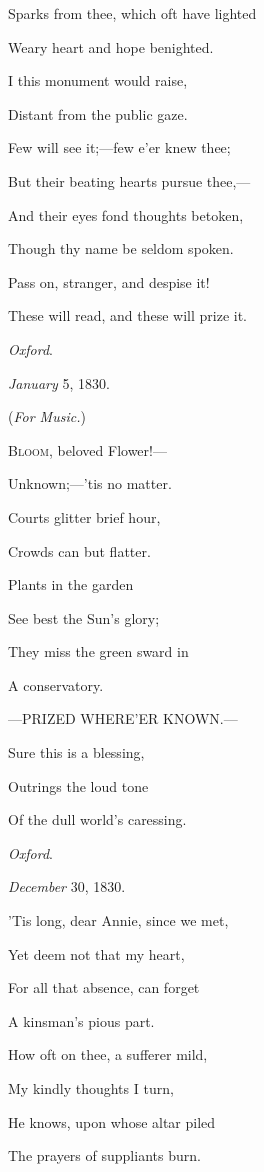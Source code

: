 Sparks from thee, which oft have lighted

Weary heart and hope benighted.

I this monument would raise,

Distant from the public gaze.

Few will see it;—few e'er knew thee;

But their beating hearts pursue thee,—

And their eyes fond thoughts betoken,

Though thy name be seldom spoken.

Pass on, stranger, and despise it!

These will read, and these will prize it.

\emph{Oxford}.

\emph{January} 5, 1830.


(\emph{For Music.})

B\textsc{loom}, beloved Flower!—

Unknown;—'tis no matter.

Courts glitter brief hour,

Crowds can but flatter.

Plants in the garden

See best the Sun's glory;

They miss the green sward in

A conservatory.

—PRIZED WHERE'ER KNOWN.—

Sure this is a blessing,

Outrings the loud tone

Of the dull world's caressing.

\emph{Oxford}.

\emph{December} 30, 1830.


'Tis long, dear Annie, since we met,

Yet deem not that my heart,

For all that absence, can forget

A kinsman's pious part.

How oft on thee, a sufferer mild,

My kindly thoughts I turn,

He knows, upon whose altar piled

The prayers of suppliants burn.


